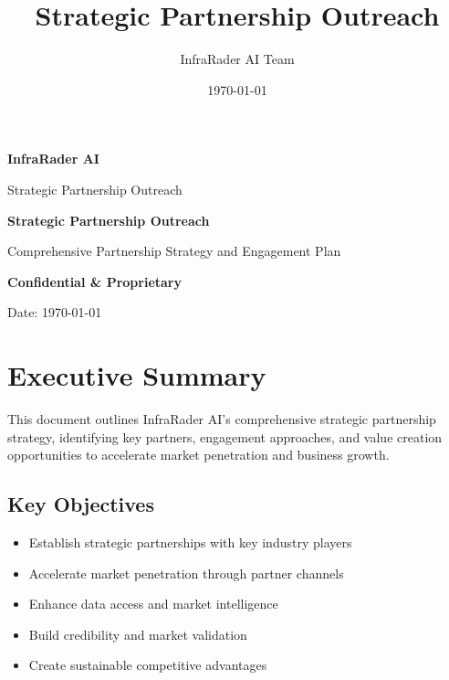 \documentclass[business]{../templates/infraradar-main}
\title{Strategic Partnership Outreach}
\author{InfraRader AI Team}
\date{\today}
\begin{document}
\begin{titlepage}
    \centering
    \vspace*{2cm}
    
    {\Huge\bfseries\color{infraradar@primary} InfraRader AI\par}
    \vspace{0.5cm}
    {\Large\color{infraradar@text} Strategic Partnership Outreach\par}
    \vspace{2cm}
    
    {\huge\bfseries Strategic Partnership Outreach\par}
    \vspace{1cm}
    
    {\large Comprehensive Partnership Strategy and Engagement Plan\par}
    \vspace{2cm}
    
    {\large\bfseries\color{infraradar@primary} Confidential \& Proprietary\par}
    {\large Date: \today\par}
    
\end{titlepage}

\tableofcontents
\newpage

\section{Executive Summary}

This document outlines InfraRader AI's comprehensive strategic partnership strategy, identifying key partners, engagement approaches, and value creation opportunities to accelerate market penetration and business growth.

\subsection{Key Objectives}
\begin{itemize}
    \item Establish strategic partnerships with key industry players
    \item Accelerate market penetration through partner channels
    \item Enhance data access and market intelligence
    \item Build credibility and market validation
    \item Create sustainable competitive advantages
\end{itemize}
\end{document}
